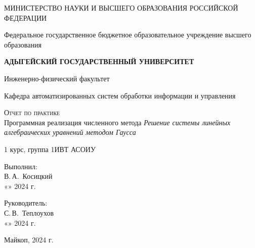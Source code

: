 \documentclass[12pt,a4paper]{scrartcl}
\begin{document}
\begin{titlepage}
		\begin{center}
			\large
			МИНИСТЕРСТВО НАУКИ И ВЫСШЕГО ОБРАЗОВАНИЯ РОССИЙСКОЙ ФЕДЕРАЦИИ
			
			Федеральное государственное бюджетное образовательное учреждение высшего образования
			
			\textbf{АДЫГЕЙСКИЙ ГОСУДАРСТВЕННЫЙ УНИВЕРСИТЕТ}
			\vspace{0.25cm}
			
			Инженерно-физический факультет
			
			Кафедра автоматизированных систем обработки информации и управления
			\vfill

			\vfill
			
			\textsc{Отчет по практике}\\[5mm]
			
			{\LARGE Программная реализация численного метода \textit{Решение системы линейных алгебраических уравнений методом Гаусса}}
			\bigskip
			
			1 курс, группа 1ИВТ АСОИУ
		\end{center}
		\vfill
		
		\newlength{\ML}
		\hfill\begin{minipage}{0.5\textwidth}
			Выполнил:\\
			\underline{\hspace{\ML}} В.\,А.~Косицкий\\
			«\underline{\hspace{0.7cm}}» \underline{\hspace{2cm}} 2024 г.
		\end{minipage}%
		\bigskip
		
		\hfill\begin{minipage}{0.5\textwidth}
			Руководитель:\\
			\underline{\hspace{\ML}} С.\,В.~Теплоухов\\
			«\underline{\hspace{0.7cm}}» \underline{\hspace{2cm}} 2024 г.
		\end{minipage}%
		\vfill
		
		\begin{center}
			Майкоп, 2024 г.
		\end{center}
	\end{titlepage}
\end{document}
